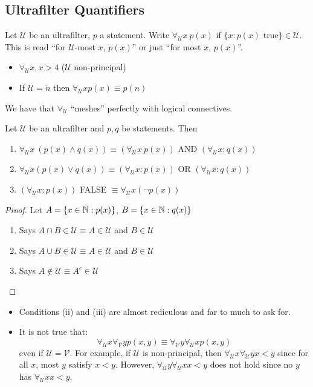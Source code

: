 \documentclass[a4paper]{article}
\renewcommand{\U}{\mathcal{U}}
\renewcommand{\V}{\mathcal{V}}
\begin{document}
  \subsection{Ultrafilter Quantifiers}

  \begin{defi}[$\forall_{\U}x$]\index{$\forall_{\U}x$}
    Let $\U$ be an ultrafilter, $p$ a statement. Write $\forall_{\U} x \ p(x)$
    if $\{ x : p(x) \text{ true}\} \in \U$. This is read ``for $\U$-most $x$,
    $p(x)$'' or just ``for most $x$, $p(x)$''.
  \end{defi}
  \begin{eg}
    \begin{itemize}
    \item $\forall_{\U} x, x > 4$ ($\U$ non-principal)
    \item If $\U = \tilde{n}$ then $\forall_{\U} x p(x) \equiv p(n)$
    \end{itemize}
  \end{eg}
  We have that $\forall_{\U}$ ``meshes'' perfectly with logical connectives.
  \begin{prop}
    Let $\U$ be an ultrafilter and $p, q$ be statements. Then
    \begin{enumerate}
    \item $\forall_{\U}x \ \left( p(x) \wedge q(x) \right) \equiv \left(
        \forall_{\U}x \ p(x) \right)$ AND $\left( \forall_{\U}x : q(x)
      \right)$
    \item $\forall_{\U}x \left( p(x) \vee q(x) \right) \equiv \left(
        \forall_{\U}x : p(x)  \right)$ OR $\left( \forall_{\U}x :
        q(x) \right)$
    \item $\left( \forall_{\U}x : p(x) \right)$ FALSE $\equiv
      \forall_{\U}x \left( \neg p(x) \right)$
    \end{enumerate}
  \end{prop}
  \begin{proof}
    Let $A = \{x \in \mathbb{N} : p(x)\}$, $B = \{ x \in \mathbb{N} : q(x)\}$
    \begin{enumerate}
    \item Says $A \cap B \in \U \equiv A \in \U$ and $B \in \U$
    \item Says $A \cup B \in \U \equiv A \in \U$ and $B \in \U$
    \item Says $A \not\in \U \equiv A^c \in \U$
    \end{enumerate}
  \end{proof}
  \begin{remarks}
    \begin{itemize}
    \item Conditions (ii) and (iii) are almost rediculous and far to
      much to ask for.
    \item It is not true that:
      \[\forall_{\U}x\forall_{\V}y p(x,y) \equiv
        \forall_{\V}y\forall_{\U}x p(x,y)\]
      even if $\U = \V$. For example, if $\U$ is non-principal, then
      $\forall_{\U}x\forall_{\U}y x < y$ since for all $x$, most $y$
      satisfy $x < y$. However, $\forall_{\U}y\forall_{\U}x x < y$
      does not hold since no $y$ has $\forall_{\U}x x < y$.
    \end{itemize}
  \end{remarks}
\end{document}
